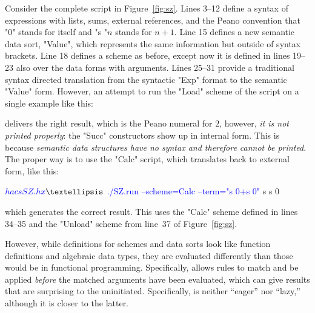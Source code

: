 \documentclass[11pt]{article} %
\begin{document}
\begin{example}
  Consider the complete \HAX script in Figure~\ref{fig:sz}. Lines 3--12 define a syntax of
  expressions with lists, sums, external references, and the Peano convention that "0" stands for
  itself and "s "$n$ stands for $n+1$. Line 15 defines a new semantic data sort, "Value", which
  represents the same information but outside of syntax brackets. Line 18 defines a scheme as
  before, except now it is defined in lines 19--23 also over the data forms with arguments. Lines
  25--31 provide a traditional syntax directed translation from the syntactic "Exp" format to the
  semantic "Value" form. However, an attempt to run the "Load" scheme of the script on a single
  example like this:
  delivers the right result, which is the Peano numeral for $2$,
  however, \emph{it is not printed properly}: the "Succ" constructors show up in internal form. This
  is because \emph{semantic data structures have no syntax and therefore cannot be printed}. The
  proper way is to use the "Calc" script, which translates back to external form, like this:
  \begin{code}[commandchars=\\\{\}]
$ \textcolor{blue}{hacs SZ.hx}
…
$ \textcolor{blue}{./SZ.run --scheme=Calc --term="s 0+s 0"}
 s  s  0   
  \end{code}
  which generates the correct result. This uses the "Calc" scheme defined in lines 34--35 and the
  "Unload" scheme from line~37 of Figure~\ref{fig:sz}.
\end{example}

However, while \HAX definitions for schemes and data sorts look like function definitions and
algebraic data types, they are evaluated differently than those would be in functional programming.
Specifically, \HAX allows rules to match and be applied \emph{before} the matched arguments have
been evaluated, which can give results that are surprising to the uninitiated. Specifically, \HAX is
neither ``eager'' nor ``lazy,'' although it is closer to the latter.
\end{document}
